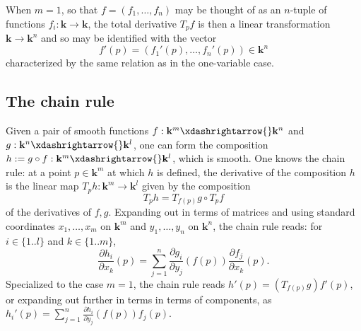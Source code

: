 \documentclass[reqno]{amsart} 
\begin{document}
When $m = 1$, so that $f = (f_1,\dotsc,f_n)$
may be thought of as an $n$-tuple of functions $f_i : \mathbf{k} \rightarrow \mathbf{k}$,
the total derivative $T_p f$
is then a linear transformation $\mathbf{k} \rightarrow \mathbf{k}^n$
and so may be identified with the vector
\begin{equation*}
f'(p) = (f_1'(p), \dotsc, f_n'(p)) \in \mathbf{k}^n
\end{equation*}
characterized by the same relation as in the one-variable case.

\subsection{The chain rule}
\label{sec:org56f7558}
Given a pair of smooth functions
$f : \mathbf{k}^m \xdashrightarrow{} \mathbf{k}^n$
and $g : \mathbf{k}^n \xdashrightarrow{} \mathbf{k}^l$,
one can  form the composition
$h := g \circ f : \mathbf{k}^m \xdashrightarrow{} \mathbf{k}^l$, which is smooth.
One knows the chain rule: at a point $p \in \mathbf{k}^m$ at which $h$ is defined,
the derivative of the composition $h$ is the linear map
$T_p h  : \mathbf{k}^m \rightarrow \mathbf{k}^l$
given by the composition
\begin{equation*}
T_p h = T_{f(p)} g \circ T_p f
\end{equation*}
of the derivatives of $f,g$.
Expanding out in terms of matrices
and using standard coordinates $x_1,\dotsc,x_m$
on $\mathbf{k}^m$
and $y_1,\dotsc,y_n$ on $\mathbf{k}^n$,
the chain rule reads:
for $i \in \{1..l\}$
and $k \in \{1..m\}$,
\begin{equation*}
\frac{\partial h_i}{\partial x_k }(p)
=
\sum_{j=1}^n
\frac{\partial g_i}{\partial y_j}(f(p))
\frac{\partial f_j}{\partial x_k}(p).
\end{equation*}
Specialized to the case $m=1$, the chain rule reads
$h'(p) = (T_{f(p)} g) f'(p)$,
or expanding out further in terms in terms of components, as
$h_i'(p)
= \sum_{j=1}^n
\frac{\partial h_i}{\partial y_j}(f(p))
f_j(p)$.
\end{document}
